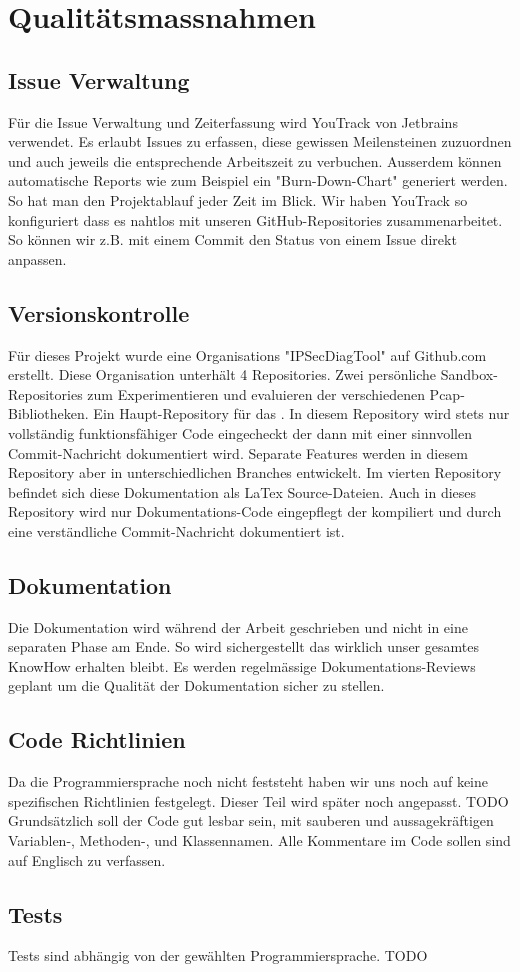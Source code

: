 \section{Qualitätsmassnahmen}
\label{sec:Qualitätsmassnahmen}

\subsection{Issue Verwaltung}
Für die Issue Verwaltung und Zeiterfassung wird YouTrack von Jetbrains verwendet. Es erlaubt Issues zu erfassen, diese gewissen Meilensteinen zuzuordnen und auch jeweils die entsprechende Arbeitszeit zu verbuchen. Ausserdem können automatische Reports wie zum Beispiel ein "Burn-Down-Chart" generiert werden. So hat man den Projektablauf jeder Zeit im Blick. Wir haben YouTrack so konfiguriert dass es nahtlos mit unseren GitHub-Repositories zusammenarbeitet. So können wir z.B. mit einem Commit den Status von einem Issue direkt anpassen.

\subsection{Versionskontrolle}
Für dieses Projekt wurde eine Organisations "IPSecDiagTool" auf Github.com erstellt. Diese Organisation unterhält 4 Repositories. Zwei persönliche Sandbox-Repositories zum Experimentieren und evaluieren der verschiedenen Pcap-Bibliotheken. Ein Haupt-Repository für das \tool . In diesem Repository wird stets nur vollständig funktionsfähiger Code eingecheckt der dann mit einer sinnvollen Commit-Nachricht dokumentiert wird. Separate Features werden in diesem Repository aber in unterschiedlichen Branches entwickelt.
Im vierten Repository befindet sich diese Dokumentation als LaTex Source-Dateien. Auch in dieses Repository wird nur Dokumentations-Code eingepflegt der kompiliert und durch eine verständliche Commit-Nachricht dokumentiert ist.

\subsection{Dokumentation}
Die Dokumentation wird während der Arbeit geschrieben und nicht in eine separaten Phase am Ende. So wird sichergestellt das wirklich unser gesamtes KnowHow erhalten bleibt.
Es werden regelmässige Dokumentations-Reviews geplant um die Qualität der Dokumentation sicher zu stellen.

\subsection{Code Richtlinien}
Da die Programmiersprache noch nicht feststeht haben wir uns noch auf keine spezifischen Richtlinien festgelegt. Dieser Teil wird später noch angepasst. TODO
Grundsätzlich soll der Code gut lesbar sein, mit sauberen und aussagekräftigen Variablen-, Methoden-, und Klassennamen. Alle Kommentare im Code sollen sind auf Englisch zu verfassen.

\subsection{Tests}
Tests sind abhängig von der gewählten Programmiersprache. TODO
